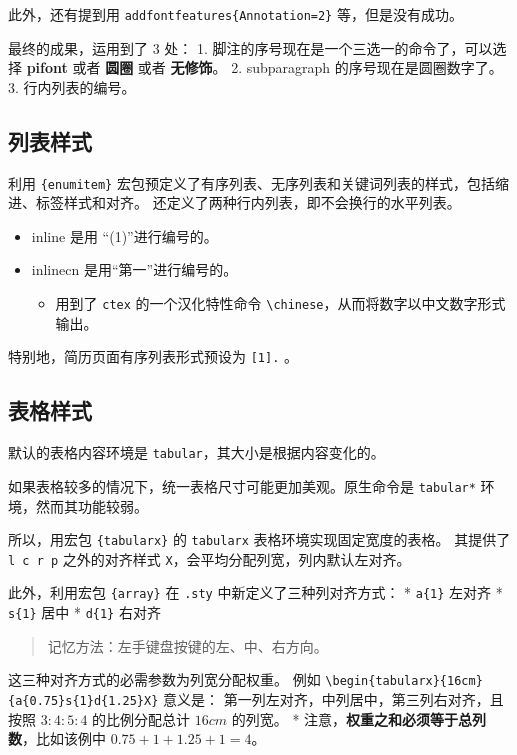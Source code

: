 \documentclass[../Main/thesis.tex]{subfiles}
\begin{document}
此外，还有提到用 \texttt{addfontfeatures\{Annotation=2\}}
等，但是没有成功。

最终的成果，运用到了 3 处： 1.
脚注的序号现在是一个三选一的命令了，可以选择 \textbf{pifont} 或者
\textbf{圆圈} 或者 \textbf{无修饰}。 2. subparagraph
的序号现在是圆圈数字了。 3. 行内列表的编号。

\subsection{列表样式}

利用 \texttt{\{enumitem\}}
宏包预定义了有序列表、无序列表和关键词列表的样式，包括缩进、标签样式和对齐。
还定义了两种行内列表，即不会换行的水平列表。

\begin{itemize}
\item
  inline 是用 ``(1)''进行编号的。
\item
  inlinecn 是用``第一''进行编号的。

  \begin{itemize}
  \item
    用到了 \texttt{ctex} 的一个汉化特性命令
    \texttt{\textbackslash{}chinese}，从而将数字以中文数字形式输出。
  \end{itemize}
\end{itemize}

特别地，简历页面有序列表形式预设为 \texttt{{[}1{]}.} 。

\subsection{表格样式}

默认的表格内容环境是 \texttt{tabular}，其大小是根据内容变化的。

如果表格较多的情况下，统一表格尺寸可能更加美观。原生命令是
\texttt{tabular*} 环境，然而其功能较弱。

所以，用宏包 \texttt{\{tabularx\}} 的 \texttt{tabularx}
表格环境实现固定宽度的表格。 其提供了 \texttt{l\ c\ r\ p} 之外的对齐样式
\texttt{X}，会平均分配列宽，列内默认左对齐。

此外，利用宏包 \texttt{\{array\}} 在 \texttt{.sty}
中新定义了三种列对齐方式： * \texttt{a\{1\}} 左对齐 * \texttt{s\{1\}}
居中 * \texttt{d\{1\}} 右对齐

\begin{quote}
记忆方法：左手键盘按键的左、中、右方向。
\end{quote}

这三种对齐方式的必需参数为列宽分配权重。 例如
\texttt{\textbackslash{}begin\{tabularx\}\{16cm\}\{a\{0.75\}s\{1\}d\{1.25\}X\}}
意义是： 第一列左对齐，中列居中，第三列右对齐，且按照 \(3:4:5:4\)
的比例分配总计 \(16cm\) 的列宽。 *
注意，\textbf{权重之和必须等于总列数}，比如该例中 \(0.75+1+1.25+1=4\)。
\end{document}
